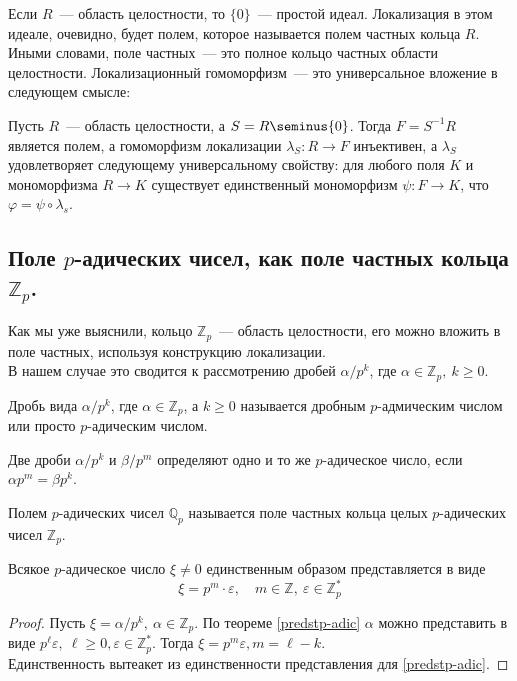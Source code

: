\documentclass[11pt]{article}
\begin{document}
    Если $R$~--- область целостности, то $\{ 0 \}$~--- простой идеал. Локализация в этом идеале, очевидно,
    будет полем, которое называется полем частных кольца $R$.\\

    Иными словами, поле частных~--- это полное кольцо частных области целостности. Локализационный гомоморфизм~--- это
    универсальное вложение в следующем смысле:

    \begin{lemma}
        Пусть $R$~--- область целостности, а $S = R\seminus \{ 0 \}$. Тогда $F = S^{-1}R$ является полем, а гомоморфизм
        локализации $\lambda_{S}\colon R \to F$ инъективен, а $\lambda_{S}$ удовлетворяет следующему универсальному свойству:
        для любого поля $K$ и мономорфизма $R \to K$ существует единственный мономорфизм $\psi\colon F \to K$, что $\varphi = \psi \circ \lambda_s$.
    \end{lemma}

    \subsection{Поле $p$-адических чисел, как поле частных кольца $\mathbb{Z}_p$.}

    Как мы уже выяснили, кольцо $\mathbb{Z}_p$~--- область целостности, его можно вложить в поле частных, используя
    конструкцию локализации.\\
    В нашем случае это сводится к рассмотрению дробей $\alpha / p^k$, где $\alpha \in \mathbb{Z}_p, \ k \ge 0$.
    \begin{definition}
        Дробь вида $\alpha / p^k$, где $\alpha \in \mathbb{Z}_p$, а $k \ge 0$ называется дробным $p$-адмическим числом
        или просто $p$-адическим числом.
    \end{definition}
    \begin{remark}
         Две дроби $\alpha / p^k$ и $\beta / p^m$ определяют одно и то же $p$-адическое число, если $\alpha p^m = \beta p^k$.
    \end{remark}

    \begin{definition}
        Полем  $p$-адических чисел $\mathbb{Q}_p$ называется поле частных кольца целых $p$-адических чисел $\mathbb{Z}_p$.
    \end{definition}

    \begin{theorem}
        Всякое $p$-адическое число $\xi \neq 0$ единственным образом представляется в виде
        \[ \xi = p^m \cdot \varepsilon, \quad m \in \mathbb{Z}, \ \varepsilon \in \mathbb{Z}_p^{*} \]
    \end{theorem}
    \begin{proof}
        Пусть $\xi = \alpha / p^k, \ \alpha \in \mathbb{Z}_p$. По теореме \ref{predstp-adic}  $\alpha$ можно представить в виде
        $p^{\ell} \varepsilon, \ \ell \ge 0, \varepsilon \in \mathbb{Z}_p^{*}$. Тогда $\xi = p^m \varepsilon, m = \ell - k$.\\
        Единственность вытеакет из единственности представления для \ref{predstp-adic}.
    \end{proof}
\end{document}

